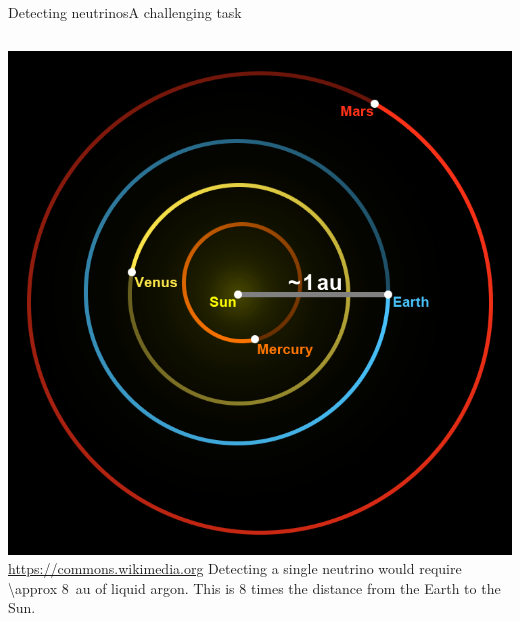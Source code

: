 \documentclass[]{beamer}
\newcommand*{\emphcol}{blue}
\begin{document}
\begin{frame}{Detecting neutrinos}{A challenging task}
	\begin{columns}[c]
		\centering
		\includegraphics[width=\textwidth]{defence/Astronomical_unit}\\
		{\tiny\url{https://commons.wikimedia.org}}
		Detecting a single neutrino would require {\color{\emphcol}\SI{\approx 8}{au}} of liquid argon.
		This is \num{8} times the distance from the Earth to the Sun.
	\end{columns}
\end{frame}
\end{document}
